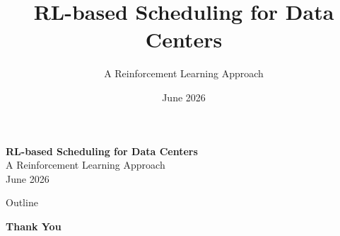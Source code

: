 \documentclass[aspectratio=169]{beamer}  %
\title[RL Scheduling for DCs]{RL-based Scheduling for Data Centers}
\subtitle{A Reinforcement Learning Approach}
\date{June 2026}
\begin{document}
\begin{frame}[plain]
  \vfill
  \begin{center}
    {\Huge\bfseries\color{DeepBlue} RL-based Scheduling for Data Centers}\\[0.6em]
    {\Large\color{SkyBlue} A Reinforcement Learning Approach}\\[1.4em]
    {\large\color{DeepBlue!80!black} June 2026}
  \end{center}
  \vfill
\end{frame}

\begin{frame}{Outline}
  \tableofcontents
\end{frame}










\begin{frame}
  \centering
  \Huge\textbf{Thank You}\\[0.8em]
\end{frame}


\end{document}
